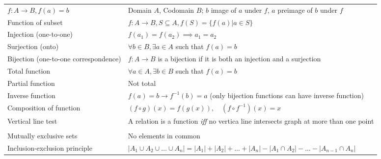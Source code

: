 \documentclass[a4paper,landscape]{article}
\begin{document}
\begin{multicols*}{2}
\begin{tabularx}{\columnwidth}{@{}lX@{}}
        \\
        $f: A \to B, f(a)=b$                       & Domain $A$, Codomain $B$; $b$ image of $a$ under $f$, $a$ preimage of $b$ under $f$                                  \\
        Function of subset                         & $f: A \to B, S \subseteq A, f(S) = \{f(a) | a \in S\}$                                                               \\
        Injection (one-to-one)                     & $f(a_1) = f(a_2) \implies a_1 = a_2$                                                                                 \\
        Surjection (onto)                          & $\forall b \in B, \exists a \in A$ such that $f(a) = b$                                                              \\
        Bijection (one-to-one correspondence)      & $f: A \to B$ is a bijection if it is both an injection and a surjection                                              \\
        Total function                             & $\forall a \in A, \exists b \in B$ such that $f(a) = b$                                                              \\
        Partial function                           & Not total                                                                                                            \\
        Inverse function                           & $f(a)=b \to f^{-1}(b)=a$ (only bijection functions can have inverse function)                                        \\
        Composition of function                    & $(f \circ g)(x) = f(g(x)),\quad (f \circ f^{-1})(x) = x$                                                             \\
        Vertical line test                         & A relation is a function \textit{iff} no vertica line intersects graph at more than one point                        \\
        \\
        Mutually exclusive sets                    & No elements in common                                                                                                \\
        Inclusion-exclusion principle              & $|A_1 \cup A_2 \cup \dots \cup A_n| = |A_1| + |A_2| + \dots + |A_n| - |A_1 \cap A_2| - \dots - |A_{n-1} \cap A_n|$   \\

\end{tabularx}
\end{multicols*}
\end{document}
